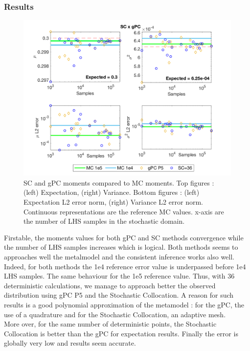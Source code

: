 \documentclass[11pt, a4paper, English]{report}
\begin{document}
\subsubsection{Results}
\begin{figure}[h!]
    \centering
    \includegraphics[width=\linewidth]{SCxGPC_moments2.png}
    \caption{SC and gPC moments compared to MC moments. Top figures : (left) Expectation, (right) Variance. Bottom figures : (left) Expectation L2 error norm, (right) Variance L2 error norm. Continuous representations are the reference MC values. x-axis are the number of LHS samples in the stochastic domain.}
    \label{comparaison1}
\end{figure}
Firstable, the moments values for both gPC and SC methods convergence while the number of LHS samples increases which is logical. Both methods seems to approaches well the metalmodel and the consistent inference works also well. Indeed, for both methods the 1e4 reference error value is underpassed before 1e4 LHS samples. The same behaviour for the 1e5 reference value. Thus, with 36 deterministic calculations, we manage to approach better the observed distribution using gPC P5 and the Stochastic Collocation. A reason for such results is a good polynomial approximation of the metamodel : for the gPC, the use of a quadrature and for the Stochastic Collocation, an adaptive mesh. \\ More over, for the same number of deterministic points, the Stochastic Collocation is better than the gPC for expectation results. Finally the error is globally very low and results seem accurate. 
%
\end{document}
